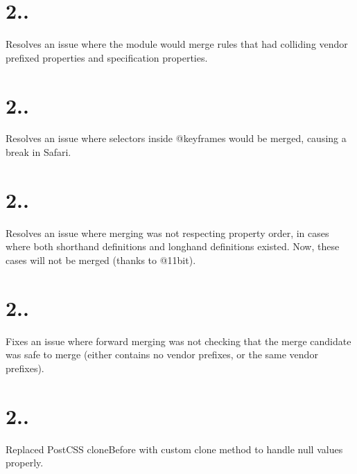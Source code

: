 \section*{2..}


\begin{DoxyItemize}
\item Resolves an issue where the module would merge rules that had colliding vendor prefixed properties and specification properties.
\end{DoxyItemize}

\section*{2..}


\begin{DoxyItemize}
\item Resolves an issue where selectors inside {\ttfamily @keyframes} would be merged, causing a break in Safari.
\end{DoxyItemize}

\section*{2..}


\begin{DoxyItemize}
\item Resolves an issue where merging was not respecting property order, in cases where both shorthand definitions and longhand definitions existed. Now, these cases will not be merged (thanks to @11bit).
\end{DoxyItemize}

\section*{2..}


\begin{DoxyItemize}
\item Fixes an issue where forward merging was not checking that the merge candidate was safe to merge (either contains no vendor prefixes, or the same vendor prefixes).
\end{DoxyItemize}

\section*{2..}


\begin{DoxyItemize}
\item Replaced Post\+C\+SS\textquotesingle{} {\ttfamily clone\+Before} with custom clone method to handle {\ttfamily null} values properly.
\end{DoxyItemize}

